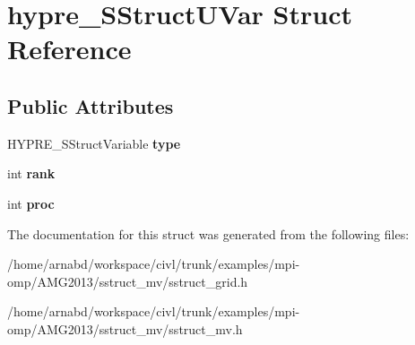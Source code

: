 \hypertarget{structhypre__SStructUVar}{}\section{hypre\+\_\+\+S\+Struct\+U\+Var Struct Reference}
\label{structhypre__SStructUVar}
\subsection*{Public Attributes}
\begin{DoxyCompactItemize}
\item 
\hypertarget{structhypre__SStructUVar_acbe086b2bbf6ace006899f5192fd4d26}{}H\+Y\+P\+R\+E\+\_\+\+S\+Struct\+Variable {\bfseries type}\label{structhypre__SStructUVar_acbe086b2bbf6ace006899f5192fd4d26}

\item 
\hypertarget{structhypre__SStructUVar_a5ac3ac0a7e04a485f1d24d2fb8572294}{}int {\bfseries rank}\label{structhypre__SStructUVar_a5ac3ac0a7e04a485f1d24d2fb8572294}

\item 
\hypertarget{structhypre__SStructUVar_a40dfeac97fa1ed5746c6c836f3000eab}{}int {\bfseries proc}\label{structhypre__SStructUVar_a40dfeac97fa1ed5746c6c836f3000eab}

\end{DoxyCompactItemize}


The documentation for this struct was generated from the following files\+:\begin{DoxyCompactItemize}
\item 
/home/arnabd/workspace/civl/trunk/examples/mpi-\/omp/\+A\+M\+G2013/sstruct\+\_\+mv/sstruct\+\_\+grid.\+h\item 
/home/arnabd/workspace/civl/trunk/examples/mpi-\/omp/\+A\+M\+G2013/sstruct\+\_\+mv/sstruct\+\_\+mv.\+h\end{DoxyCompactItemize}
